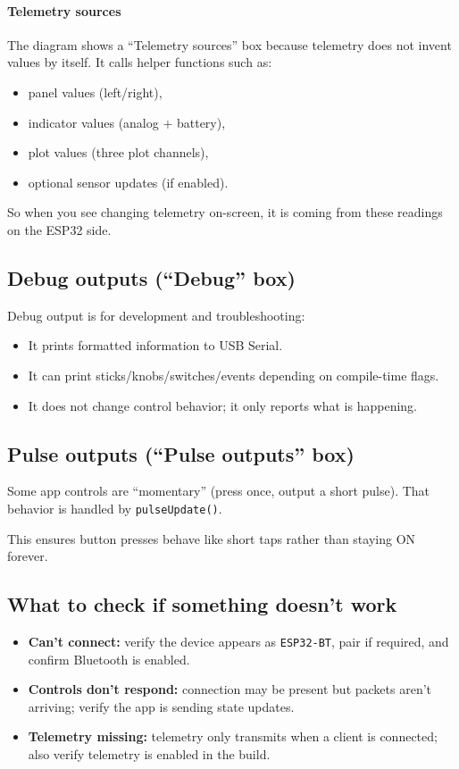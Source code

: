 \documentclass[a3paper,11pt]{article}
\begin{document}
\paragraph{Telemetry sources}
The diagram shows a ``Telemetry sources'' box because telemetry does not invent values by itself.
It calls helper functions such as:
\begin{itemize}
	\item panel values (left/right),
	\item indicator values (analog + battery),
	\item plot values (three plot channels),
	\item optional sensor updates (if enabled).
\end{itemize}

So when you see changing telemetry on-screen, it is coming from these readings on the ESP32 side.

\subsection{Debug outputs (``Debug'' box)}
Debug output is for development and troubleshooting:
\begin{itemize}
	\item It prints formatted information to USB Serial.
	\item It can print sticks/knobs/switches/events depending on compile-time flags.
	\item It does not change control behavior; it only reports what is happening.
\end{itemize}

\subsection{Pulse outputs (``Pulse outputs'' box)}
Some app controls are ``momentary'' (press once, output a short pulse).
That behavior is handled by \texttt{pulseUpdate()}.

This ensures button presses behave like short taps rather than staying ON forever.

\subsection{What to check if something doesn’t work}
\begin{itemize}
	\item \textbf{Can’t connect:} verify the device appears as \texttt{ESP32-BT}, pair if required, and confirm Bluetooth is enabled.
	\item \textbf{Controls don’t respond:} connection may be present but packets aren’t arriving; verify the app is sending state updates.
	\item \textbf{Telemetry missing:} telemetry only transmits when a client is connected; also verify telemetry is enabled in the build.
\end{itemize}

\end{document}
